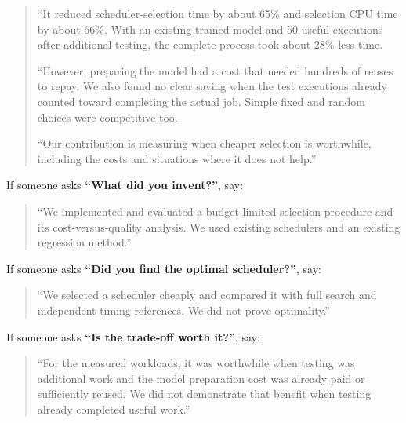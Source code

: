 \documentclass[11pt,a4paper]{article}
\begin{document}
\begin{enumerate}
\begin{quote}
  ``It reduced scheduler-selection time by about 65\% and selection CPU time by about 66\%. With an existing trained model and 50 useful executions after additional testing, the complete process took about 28\% less time.

  ``However, preparing the model had a cost that needed hundreds of reuses to repay. We also found no clear saving when the test executions already counted toward completing the actual job. Simple fixed and random choices were competitive too.

  ``Our contribution is measuring when cheaper selection is worthwhile, including the costs and situations where it does not help.''
  \end{quote}

  If someone asks \textbf{``What did you invent?''}, say:

  \begin{quote}
  ``We implemented and evaluated a budget-limited selection procedure and its cost-versus-quality analysis. We used existing schedulers and an existing regression method.''
  \end{quote}

  If someone asks \textbf{``Did you find the optimal scheduler?''}, say:

  \begin{quote}
  ``We selected a scheduler cheaply and compared it with full search and independent timing references. We did not prove optimality.''
  \end{quote}

  If someone asks \textbf{``Is the trade-off worth it?''}, say:

  \begin{quote}
  ``For the measured workloads, it was worthwhile when testing was additional work and the model preparation cost was already paid or sufficiently reused. We did not demonstrate that benefit when testing already completed useful work.''
  \end{quote}
\end{enumerate}
\end{document}
